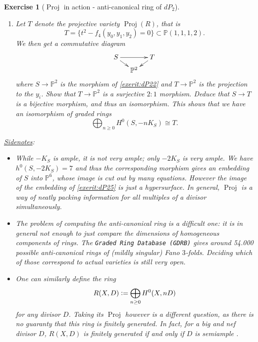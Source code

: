 \documentclass[a4paper,11pt]{amsart}
\newtheorem{exercise}[theorem]{Exercise}
\def\Proj{\operatorname{Proj}}
\newcommand{\PP}{\mathbb{P}}
\newcommand{\isom}{\cong}
\newcommand{\defeq}{\vcentcolon=}
\begin{document}
\begin{exercise}[{$\Proj$ in action - anti-canonical ring of $dP_2$}]
\begin{enumerate}[resume]
\begin{comment}
				3 & 	13		&	13		&	13		\\	\hline
				4 & 	21		&	22		&	21		\\	\hline
			\end{array}
			\]
		\end{comment}
		and deduce that there is an equation $F(y_0,y_1,y_2,t)$ of degree $4$
		among the $y_i$ and $t$.
		Accept as a fact (or suffer the calculations) that, up to a change of coordinates, $F$ takes the form
		\[
		t^2 - f_4(y_0,y_1,y_2).
		\]
		\item\label{exerit:dP25} Let $T$ denote the projective variety $\Proj(R)$, that is 
		\[
		T = \{t^2 - f_4(y_0,y_1,y_2) = 0\} \subset \PP(1,1,1,2).
		\]
		We then get a commutative diagram
		\[
		\xymatrix@R=.2cm@C=.4cm{
		S \ar[rd] \ar[rr] && T \ar[ld]\\
		& \PP^2
		}
		\]
		where $S\to \PP^2$ is the morphism of \eqref{exerit:dP22} and $T \to \PP^2$ is the projection to the $y_i$.
		Show that $T \to \PP^2$ is a surjective $2:1$ morphism.
		Deduce that $S \to T$ is a bijective morphism, and thus an isomorphism. 
		This shows that we have an isomorphism of graded rings
		\[
		\bigoplus_{n\geq 0}H^0(S,-nK_S) \isom T.
		\]
	\end{enumerate}	
	\underline{Sidenotes}:
	\begin{itemize}
		\item While $-K_S$ is ample, it is not very ample; only $-2K_S$ is very ample.
		We have $h^0(S,-2K_S) = 7$ and thus the corresponding morphism gives an embedding of $S$ into $\PP^6$, whose image is cut out by \emph{many} equations.
		However the image of the embedding of \eqref{exerit:dP25} is  just a hypersurface.
		In general, $\Proj$ is a way of neatly packing information for all multiples of a divisor simultaneously.
		\item The problem of computing the anti-canonical ring is a difficult one: it is in general not enough to just compare the dimensions of homogeneous components of rings.
		The \emph{\texttt{Graded Ring Database (GDRB)}} \href{https://grdb.co.uk/}{ \small \faExternalLink} gives around 54.000 \emph{possible} anti-canonical rings of (mildly singular) Fano $3$-folds.
		Deciding which of those correspond to actual varieties is still very open.
		\item One can similarly define the ring
		\[
		R(X,D) \defeq \bigoplus_{n\geq 0}H^0(X,nD)
		\]
		for any divisor $D$.
		Taking its $\Proj$ however is a different question, as there is no guaranty that this ring is finitely generated.
		In fact, for a big and nef divisor $D$, $R(X,D)$ is finitely generated if and only if $D$ is semiample \cite[Theorem 2.3.15]{Lazarsfeld1}.

\end{itemize}
\end{exercise}
\end{document}
